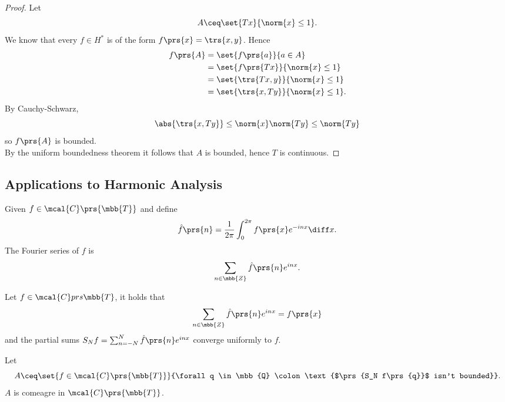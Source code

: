 \documentclass[10pt, twoside]{book}
\begin{document}
\begin{proof}
Let
\[A \ceq \set{Tx}{\norm{x} \leq 1} \text{.}\]
We know that every $f \in H^*$ is of the form $f\prs{x} = \trs{x,y}$. Hence
\begin{align*}
f\prs{A} &= \set{f\prs{a}}{a \in A}
\\&= \set{f\prs{Tx}}{\norm{x} \leq 1}
\\&= \set{\trs{Tx, y}}{\norm{x} \leq 1}
\\&= \set{\trs{x, Ty}}{\norm{x} \leq 1} \text{.}
\end{align*}
By Cauchy-Schwarz,
\[\abs{\trs{x,Ty}} \leq \norm{x} \norm{Ty} \leq \norm{Ty}\]
so $f\prs{A}$ is bounded.
\\
By the uniform boundedness theorem it follows that $A$ is bounded, hence $T$ is continuous.
\end{proof}

\subsection{Applications to Harmonic Analysis}

\begin{definition}
Given $f \in \mcal{C}\prs{\mbb{T}}$ and define
\[\hat{f}\prs{n} = \frac{1}{2 \pi} \int_0^{2 \pi} f\prs{x} e^{-i n x} \diff x \text{.}\]
The Fourier series of $f$ is
\[\sum_{n \in \mbb{Z}} \hat{f}\prs{n} e^{inx} \text{.}\]
\end{definition}

\begin{theorem}[Dirichlet]
Let $f \in \mcal{C}prs{\mbb{T}}$, it holds that
\[\sum_{n \in \mbb{Z}} \hat{f}\prs{n} e^{inx} = f\prs{x}\]
and the partial sums $S_N f = \sum_{n = - N}^N \hat{f}\prs{n} e^{inx}$ converge uniformly to $f$.
\end{theorem}

\begin{theorem}
Let
\[A \ceq \set{f \in \mcal{C}\prs{\mbb{T}}}{\forall q \in \mbb{Q} \colon \text{$\prs{S_N f\prs{q}}$ isn't bounded}} \text{.}\]
$A$ is comeagre in $\mcal{C}\prs{\mbb{T}}$.
\end{theorem}
\end{document}
